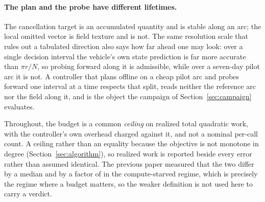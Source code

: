 \paragraph{The plan and the probe have different lifetimes.} The cancellation
target is an accumulated quantity and is stable along an arc; the local omitted
vector is field texture and is not. The same resolution scale that rules out a
tabulated direction also says how far ahead one may look: over a single
decision interval the vehicle's own state prediction is far more accurate than
$\pi r/N$, so probing forward along it is admissible, while over a seven-day
pilot arc it is not. A controller that plans offline on a cheap pilot arc and
probes forward one interval at a time respects that split, reads neither the
reference arc nor the field along it, and is the object the
campaign of Section~\ref{sec:campaign} evaluates.

Throughout, the budget is a common \emph{ceiling} on realized total quadratic
work, with the controller's own overhead charged against it, and not a nominal
per-call count. A ceiling rather than an equality because the objective is not
monotone in degree (Section~\ref{sec:algorithm}), so realized work is reported
beside every error rather than assumed identical. The
previous paper measured that the two differ by a median  and by a
factor of  in the compute-starved regime, which is precisely the
regime where a budget matters, so the weaker definition is not used here to
carry a verdict.

